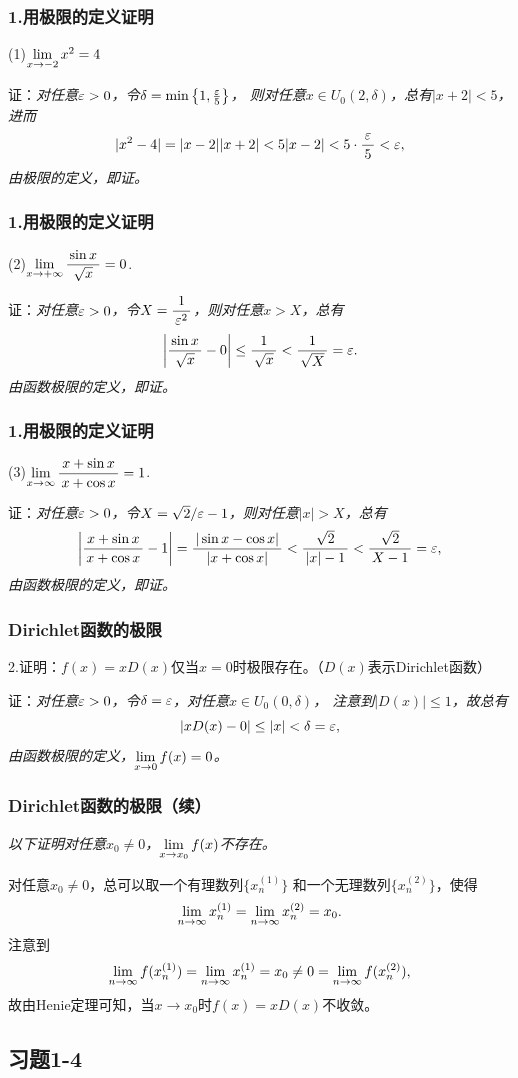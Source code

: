 \begin{frame}[t]\frametitle{1.用极限的定义证明}
\large
(1)$\lim\limits_{x\to{-2}}{x^2}=4$

证：\it 对任意$\varepsilon>0$，令$\delta=\min\left\{1,\frac{\varepsilon}5\right\}$，
则对任意$x\in U_0(2,\delta)$，总有$|x+2|<5$，进而
$$|x^2-4|=|x-2||x+2|<5|x-2|<5\cdot\displaystyle\frac{\,{\varepsilon}\,}{\,{5}\,}<\varepsilon,$$
由极限的定义，即证。\fin
\end{frame}

\begin{frame}[t]\frametitle{1.用极限的定义证明}
\large

(2)$\lim\limits_{x\to{+\infty}}\displaystyle\frac{\,{\sin x}\,}{\,{\sqrt x}\,}=0$.

证：\it 对任意$\varepsilon>0$，令$X=\displaystyle\frac{\,{1}\,}{\,{\varepsilon^2}\,}$，则对任意$x>X$，总有
$$\left|\displaystyle\frac{\,{\sin x}\,}{\,{\sqrt x}\,}-0\right|\leq\displaystyle\frac{\,{1}\,}{\,{\sqrt x}\,}
<\displaystyle\frac{\,{1}\,}{\,{\sqrt X}\,}=\varepsilon.$$
由函数极限的定义，即证。\fin
\end{frame}

\begin{frame}[t]\frametitle{1.用极限的定义证明}
\large

(3)$\lim\limits_{x\to{\infty}}\displaystyle\frac{\,{x+\sin x}\,}{\,{x+\cos x}\,}=1$.
\bs

证：\it 对任意$\varepsilon>0$，令$X=\sqrt2/\varepsilon-1$，则对任意$|x|>X$，总有
$$\left|\displaystyle\frac{\,{x+\sin x}\,}{\,{x+\cos x}\,}-1\right|
=\displaystyle\frac{\,{|\sin x-\cos x|}\,}{\,{|x+\cos x|}\,}
<\displaystyle\frac{\,{\sqrt2}\,}{\,{|x|-1}\,}<\displaystyle\frac{\,{\sqrt2}\,}{\,{X-1}\,}=\varepsilon,$$
由函数极限的定义，即证。\fin
\end{frame}

\begin{frame}[t]\frametitle{Dirichlet函数的极限}
\large

2.证明：$f(x)=xD(x)$仅当$x=0$时极限存在。（$D(x)$表示Dirichlet函数）
\bs

证：\it 对任意$\varepsilon>0$，令$\delta=\varepsilon$，对任意$x\in U_0(0,\delta)$，
注意到$|D(x)|\leq 1$，故总有
$$|xD(x)-0|\leq |x|<\delta=\varepsilon,$$
由函数极限的定义，$\lim\limits_{x\to{0}}f(x)=0$。
\end{frame}

\begin{frame}[t]\frametitle{Dirichlet函数的极限（续）}
\large
\it
以下证明对任意$x_0\ne 0$，$\lim\limits_{x\to{x_0}}f(x)$不存在。

对任意$x_0\ne0$，总可以取一个有理数列$\{x_n^{(1)}\}$
和一个无理数列$\{x_n^{(2)}\}$，使得
$$\lim\limits_{n\to\infty} x_n^{(1)}=\lim\limits_{n\to\infty} x_n^{(2)}=x_0.$$
注意到
$$\lim\limits_{n\to\infty} f(x_n^{(1)})=\lim\limits_{n\to\infty} x_n^{(1)}=x_0
\ne 0=\lim\limits_{n\to\infty} f(x_n^{(2)}),$$
故由Henie定理可知，当$x\to x_0$时$f(x)=xD(x)$不收敛。\fin
\end{frame}

\subsection{习题1-4}

